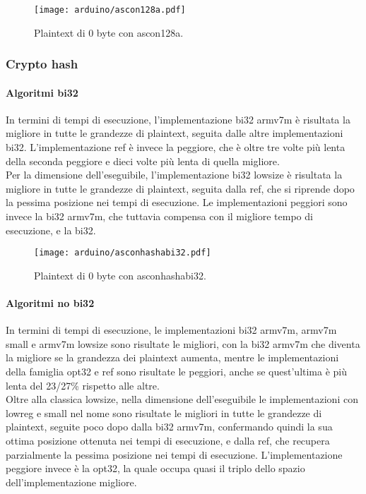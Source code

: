 \begin{figure}[H]
    \centering
    \texttt{[image: arduino/ascon128a.pdf]}
    \caption{Plaintext di 0 byte con ascon128a.}
\end{figure}

\subsubsection{Crypto hash}

\paragraph{Algoritmi bi32}

In termini di tempi di esecuzione, l'implementazione bi32 armv7m è risultata la migliore in tutte le grandezze di plaintext, seguita dalle altre implementazioni bi32. L'implementazione ref è invece la peggiore, che è oltre tre volte più lenta della seconda peggiore e dieci volte più lenta di quella migliore. \\

\noindent Per la dimensione dell'eseguibile, l'implementazione bi32 lowsize è risultata la migliore in tutte le grandezze di plaintext, seguita dalla ref, che si riprende dopo la pessima posizione nei tempi di esecuzione. Le implementazioni peggiori sono invece la bi32 armv7m, che tuttavia compensa con il migliore tempo di esecuzione, e la bi32.

\begin{figure}[H]
    \centering
    \texttt{[image: arduino/asconhashabi32.pdf]}
    \caption{Plaintext di 0 byte con asconhashabi32.}
\end{figure}

\paragraph{Algoritmi no bi32}

In termini di tempi di esecuzione, le implementazioni bi32 armv7m, armv7m small e armv7m lowsize sono risultate le migliori, con la bi32 armv7m che diventa la migliore se la grandezza dei plaintext aumenta, mentre le implementazioni della famiglia opt32 e ref sono risultate le peggiori, anche se quest'ultima è più lenta del 23/27\% rispetto alle altre. \\

\noindent Oltre alla classica lowsize, nella dimensione dell'eseguibile le implementazioni con lowreg e small nel nome sono risultate le migliori in tutte le grandezze di plaintext, seguite poco dopo dalla bi32 armv7m, confermando quindi la sua ottima posizione ottenuta nei tempi di esecuzione, e dalla ref, che recupera parzialmente la pessima posizione nei tempi di esecuzione. L'implementazione peggiore invece è la opt32, la quale occupa quasi il triplo dello spazio dell'implementazione migliore.


